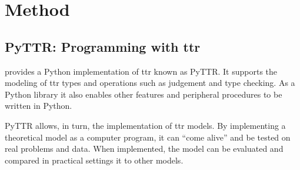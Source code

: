 \section{Method}
\label{sec:method}

\subsection{PyTTR: Programming with \gls{ttr}}
\label{sec:pyttr}

\cite{pyttr} provides a Python implementation of \gls{ttr} known as PyTTR.
It supports the modeling of \gls{ttr} types and operations such as judgement and type checking.
As a Python library it also enables other features and peripheral procedures to be written in Python.

PyTTR allows, in turn, the implementation of \gls{ttr} models.
By implementing a theoretical model as a computer program, it can ``come alive'' and be tested on real problems and data.
When implemented, the model can be evaluated and compared in practical settings it to other models.

